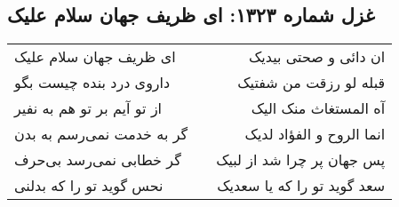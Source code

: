 \begin{center}
\section*{غزل شماره ۱۳۲۳: ای ظریف جهان سلام علیک}
\label{sec:1323}
\begin{longtable}{l p{0.5cm} r}
ای ظریف جهان سلام علیک
&&
ان دائی و صحتی بیدیک
\\
داروی درد بنده چیست بگو
&&
قبله لو رزقت من شفتیک
\\
از تو آیم بر تو هم به نفیر
&&
آه المستغاث منک الیک
\\
گر به خدمت نمی‌رسم به بدن
&&
انما الروح و الفؤاد لدیک
\\
گر خطابی نمی‌رسد بی‌حرف
&&
پس جهان پر چرا شد از لبیک
\\
نحس گوید تو را که بدلنی
&&
سعد گوید تو را که یا سعدیک
\\
\end{longtable}
\end{center}
